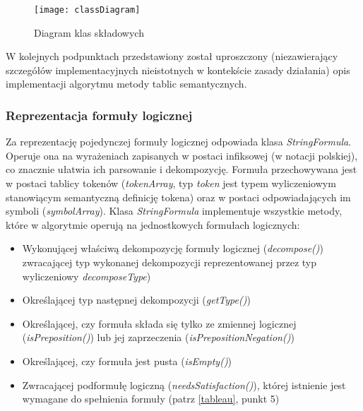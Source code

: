 \documentclass[12pt,a4paper,titlepage]{article}
\begin{document}
\begin{figure}[!htb]
\centering
\texttt{[image: classDiagram]}
\caption{Diagram klas składowych}
\end{figure}

W kolejnych podpunktach przedstawiony został uproszczony (niezawierający szczegółów implementacyjnych nieistotnych w kontekście zasady działania) opis implementacji algorytmu metody tablic semantycznych.

\subsubsection{Reprezentacja formuły logicznej}
Za reprezentację pojedynczej formuły logicznej odpowiada klasa \textit{StringFormula}. Operuje ona na wyrażeniach zapisanych w postaci infiksowej (w notacji polskiej), co znacznie ułatwia ich parsowanie i dekompozycję. Formuła przechowywana jest w postaci tablicy tokenów (\textit{tokenArray}, typ \textit{token} jest typem wyliczeniowym stanowiącym semantyczną definicję tokena) oraz w postaci odpowiadających im symboli (\textit{symbolArray}). Klasa \textit{StringFormula} implementuje wszystkie metody, które w algorytmie operują na jednostkowych formułach logicznych:
\begin{itemize}
	\item Wykonującej właściwą dekompozycję formuły logicznej (\textit{decompose()}) zwracającej typ wykonanej dekompozycji reprezentowanej przez typ wyliczeniowy \textit{decomposeType})
	\item Określającej typ następnej dekompozycji (\textit{getType()})
	\item Określającej, czy formuła składa się tylko ze zmiennej logicznej (\textit{isPreposition()}) lub jej zaprzeczenia (\textit{isPrepositionNegation()})
	\item Określającej, czy formuła jest pusta (\textit{isEmpty()})
	\item Zwracającej podformułę logiczną (\textit{needsSatisfaction()}), której istnienie jest wymagane do spełnienia formuły (patrz \ref{tableau}, punkt 5)
\end{itemize}
\end{document}
